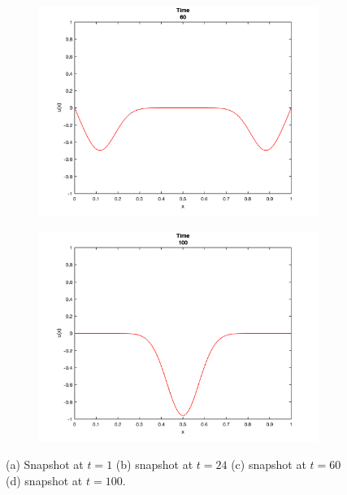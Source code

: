 \documentclass[12pt]{article}
\begin{document}
\begin{figure}[h!]
\medskip

\begin{subfigure}{0.49\columnwidth}
\centering
\includegraphics[width=\textwidth]{problem_2_t_60.png}
\caption{}
\label{fig:time3}
\end{subfigure}\hfill
\begin{subfigure}{0.49\columnwidth}
\centering
\includegraphics[width=\textwidth]{problem_2_t_100.png}
\caption{}
\label{fig:time4}
\end{subfigure}

\caption{(a) Snapshot at $t = 1$ (b) snapshot at $t = 24$ (c) snapshot at $t = 60$ (d) snapshot at $t = 100$.}
\label{fig:time}

\end{figure}
\end{document}
